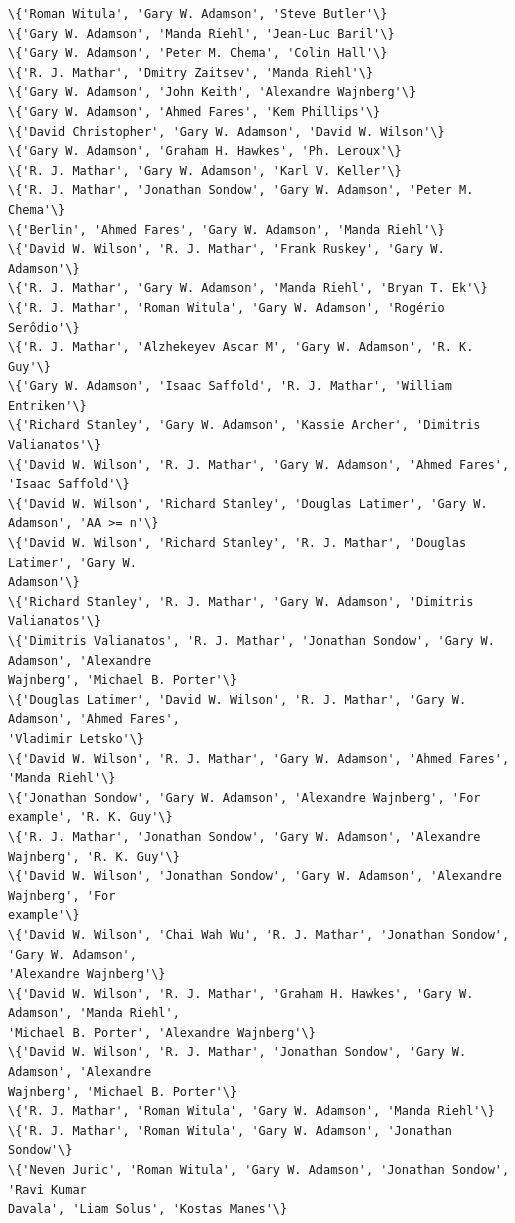 \documentclass[11pt]{article}
\begin{document}
    \begin{Verbatim}[commandchars=\\\{\}]
\{'Roman Witula', 'Gary W. Adamson', 'Steve Butler'\}
\{'Gary W. Adamson', 'Manda Riehl', 'Jean-Luc Baril'\}
\{'Gary W. Adamson', 'Peter M. Chema', 'Colin Hall'\}
\{'R. J. Mathar', 'Dmitry Zaitsev', 'Manda Riehl'\}
\{'Gary W. Adamson', 'John Keith', 'Alexandre Wajnberg'\}
\{'Gary W. Adamson', 'Ahmed Fares', 'Kem Phillips'\}
\{'David Christopher', 'Gary W. Adamson', 'David W. Wilson'\}
\{'Gary W. Adamson', 'Graham H. Hawkes', 'Ph. Leroux'\}
\{'R. J. Mathar', 'Gary W. Adamson', 'Karl V. Keller'\}
\{'R. J. Mathar', 'Jonathan Sondow', 'Gary W. Adamson', 'Peter M. Chema'\}
\{'Berlin', 'Ahmed Fares', 'Gary W. Adamson', 'Manda Riehl'\}
\{'David W. Wilson', 'R. J. Mathar', 'Frank Ruskey', 'Gary W. Adamson'\}
\{'R. J. Mathar', 'Gary W. Adamson', 'Manda Riehl', 'Bryan T. Ek'\}
\{'R. J. Mathar', 'Roman Witula', 'Gary W. Adamson', 'Rogério Serôdio'\}
\{'R. J. Mathar', 'Alzhekeyev Ascar M', 'Gary W. Adamson', 'R. K. Guy'\}
\{'Gary W. Adamson', 'Isaac Saffold', 'R. J. Mathar', 'William Entriken'\}
\{'Richard Stanley', 'Gary W. Adamson', 'Kassie Archer', 'Dimitris Valianatos'\}
\{'David W. Wilson', 'R. J. Mathar', 'Gary W. Adamson', 'Ahmed Fares', 'Isaac Saffold'\}
\{'David W. Wilson', 'Richard Stanley', 'Douglas Latimer', 'Gary W. Adamson', 'AA >= n'\}
\{'David W. Wilson', 'Richard Stanley', 'R. J. Mathar', 'Douglas Latimer', 'Gary W.
Adamson'\}
\{'Richard Stanley', 'R. J. Mathar', 'Gary W. Adamson', 'Dimitris Valianatos'\}
\{'Dimitris Valianatos', 'R. J. Mathar', 'Jonathan Sondow', 'Gary W. Adamson', 'Alexandre
Wajnberg', 'Michael B. Porter'\}
\{'Douglas Latimer', 'David W. Wilson', 'R. J. Mathar', 'Gary W. Adamson', 'Ahmed Fares',
'Vladimir Letsko'\}
\{'David W. Wilson', 'R. J. Mathar', 'Gary W. Adamson', 'Ahmed Fares', 'Manda Riehl'\}
\{'Jonathan Sondow', 'Gary W. Adamson', 'Alexandre Wajnberg', 'For example', 'R. K. Guy'\}
\{'R. J. Mathar', 'Jonathan Sondow', 'Gary W. Adamson', 'Alexandre Wajnberg', 'R. K. Guy'\}
\{'David W. Wilson', 'Jonathan Sondow', 'Gary W. Adamson', 'Alexandre Wajnberg', 'For
example'\}
\{'David W. Wilson', 'Chai Wah Wu', 'R. J. Mathar', 'Jonathan Sondow', 'Gary W. Adamson',
'Alexandre Wajnberg'\}
\{'David W. Wilson', 'R. J. Mathar', 'Graham H. Hawkes', 'Gary W. Adamson', 'Manda Riehl',
'Michael B. Porter', 'Alexandre Wajnberg'\}
\{'David W. Wilson', 'R. J. Mathar', 'Jonathan Sondow', 'Gary W. Adamson', 'Alexandre
Wajnberg', 'Michael B. Porter'\}
\{'R. J. Mathar', 'Roman Witula', 'Gary W. Adamson', 'Manda Riehl'\}
\{'R. J. Mathar', 'Roman Witula', 'Gary W. Adamson', 'Jonathan Sondow'\}
\{'Neven Juric', 'Roman Witula', 'Gary W. Adamson', 'Jonathan Sondow', 'Ravi Kumar
Davala', 'Liam Solus', 'Kostas Manes'\}
    \end{Verbatim}
\end{document}
